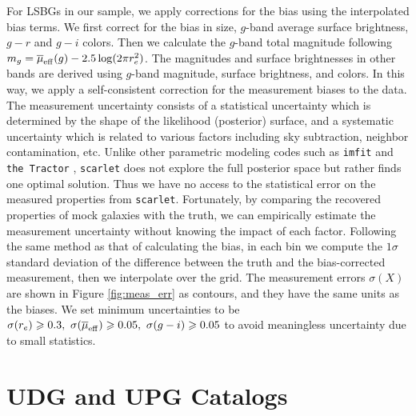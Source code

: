 \documentclass[twocolumn,astrosymb,twocolappendix,linenumbers]{aastex631}
\newcommand{\code}[1]{\texttt{#1}}
\begin{document}
\begin{CJK*}{UTF8}{gbsn}
For LSBGs in our sample, we apply corrections for the bias using the interpolated bias terms. We first correct for the bias in size, $g$-band average surface brightness, $g-r$ and $g-i$ colors. Then we calculate the $g$-band total magnitude following $m_g = \overline{\mu}_{\rm eff}(g) - 2.5\log(2\pi r_e^2)$. The magnitudes and surface brightnesses in other bands are derived using $g$-band magnitude, surface brightness, and colors. In this way, we apply a self-consistent correction for the measurement biases to the data. 
The measurement uncertainty consists of a statistical uncertainty which is determined by the shape of the likelihood (posterior) surface, and a systematic uncertainty which is related to various factors including sky subtraction, neighbor contamination, etc. Unlike other parametric modeling codes such as \code{imfit} \citep{imfit} and \code{the Tractor} \citep{Lang2016}, \code{scarlet} does not explore the full posterior space but rather finds one optimal solution. Thus we have no access to the statistical error on the measured properties from \code{scarlet}. Fortunately, by comparing the recovered properties of mock galaxies with the truth, we can empirically estimate the measurement uncertainty without knowing the impact of each factor. Following the same method as that of calculating the bias, in each bin we compute the $1\sigma$ standard deviation of the difference between the truth and the bias-corrected measurement, then we interpolate over the grid. The measurement errors $\sigma(X)$ are shown in Figure \ref{fig:meas_err} as contours, and they have the same units as the biases. We set minimum uncertainties to be $\sigma(r_e) \geqslant 0.3,\ \sigma(\overline{\mu}_{\rm eff}) \geqslant 0.05,\ \sigma(g-i) \geqslant 0.05$ to avoid meaningless uncertainty due to small statistics.


\section{UDG and UPG Catalogs}
\onecolumngrid 


\end{CJK*}
\end{document}

